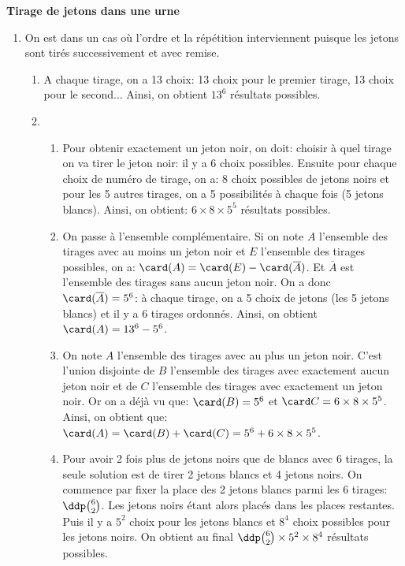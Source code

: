 \documentclass[a4paper, 11pt]{article}
\begin{document}
\begin{correction}  \; \textbf{Tirage de jetons dans une urne}
	\begin{enumerate}
		\item On est dans un cas o\`u l'ordre et la r\'ep\'etition interviennent puisque les jetons sont tir\'es successivement et avec remise.
		      \begin{enumerate}
			      \item A chaque tirage, on a 13 choix: 13 choix pour le premier tirage, 13 choix pour le second... Ainsi, on obtient $13^6$ r\'esultats possibles.
			      \item
			            \begin{enumerate}
				            \item Pour obtenir exactement un jeton noir, on doit: choisir \`a quel tirage on va tirer le jeton noir: il y a 6 choix possibles. Ensuite pour chaque choix de num\'ero de tirage, on a: 8 choix possibles de jetons noirs et pour les 5 autres tirages, on a 5 possibilit\'es \`a chaque fois (5 jetons blancs). Ainsi, on obtient: $6\times 8\times 5^5$ r\'esultats possibles.
				            \item On passe \`a l'ensemble compl\'ementaire. Si on note $A$ l'ensemble des tirages avec au moins un jeton noir et $E$ l'ensemble des tirages possibles, on a: $\card (A)=\card (E)-\card (\overline{A})$. Et $\overline{A}$ est l'ensemble des tirages sans aucun jeton noir. On a donc $\card (\overline{A})=5^6$: \`a chaque tirage, on a 5 choix de jetons (les 5 jetons blancs) et il y a 6 tirages ordonn\'es. Ainsi, on obtient $\card (A)=13^6-5^6$.
				            \item On note $A$ l'ensemble des tirages avec au plus un jeton noir. C'est l'union disjointe de $B$ l'ensemble des tirages avec exactement aucun jeton noir et de $C$ l'ensemble des tirages avec exactement un jeton noir. Or on a d\'ej\`a vu que: $\card (B)=5^6$ et $\card C=6\times 8\times 5^5$. Ainsi, on obtient que: $\card (A)=\card (B)+\card (C)= 5^6 + 6\times 8\times 5^5$.
				            \item Pour avoir 2 fois plus de jetons noirs que de blancs avec 6 tirages, la seule solution est de tirer 2 jetons blancs et 4 jetons noirs. On commence par fixer la place des 2 jetons blancs parmi les 6 tirages: $\ddp \binom{6}{2}$. Les jetons noirs \'etant alors plac\'es dans les places restantes. Puis il y a $5^2$ choix pour les jetons blancs et $8^4$ choix possibles pour les jetons noirs. On obtient au final $\ddp \binom{6}{2}\times 5^2\times 8^4$ r\'esultats possibles.

\end{enumerate}
\end{enumerate}
\end{enumerate}
\end{correction}
\end{document}
